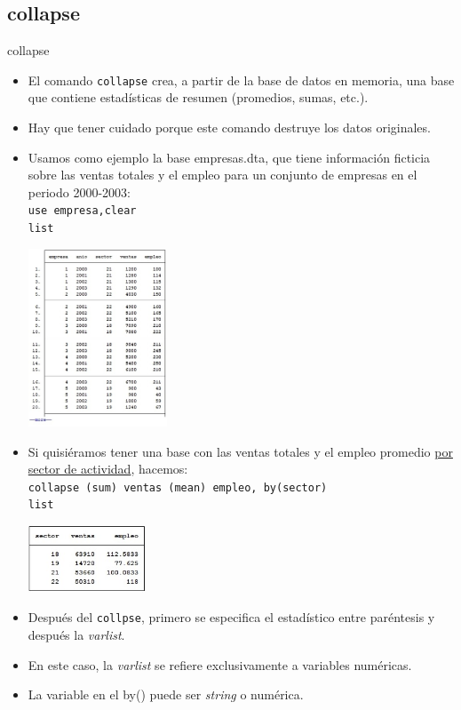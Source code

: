 \documentclass{beamer}
\begin{document}
\subsection{collapse}

\begin{frame}[allowframebreaks]{collapse}
\begin{itemize}
\item El comando \texttt{collapse} crea, a partir de la base de datos en memoria, una base que contiene estadísticas de resumen (promedios, sumas, etc.).
\item Hay que tener cuidado porque este comando destruye los datos originales.
\item Usamos como ejemplo la base empresas.dta, que tiene información ficticia sobre las ventas totales y el empleo para un conjunto de empresas en el periodo 2000-2003: \\\medskip
{\footnotesize 
\texttt{use empresa,clear}\\
\texttt{list}}\\\medskip
\centerline{\includegraphics[height=5.3cm]{emp.jpg}}
\item Si quisiéramos tener una base con las ventas totales y el empleo promedio \underline{por sector de actividad}, hacemos:\\\medskip
{\footnotesize 
\texttt{collapse (sum) ventas (mean) empleo, by(sector)}\\
\texttt{list}}\\\medskip
\centerline{\includegraphics[height=2cm]{emp1.jpg}}
\item Después del \texttt{collpse}, primero se especifica el estadístico entre paréntesis y después la \textit{varlist}. 
\item En este caso, la \textit{varlist} se refiere exclusivamente a variables numéricas. 
\item La variable en el by() puede ser \textit{string} o numérica.
\end{itemize}
\end{frame}
\end{document}
